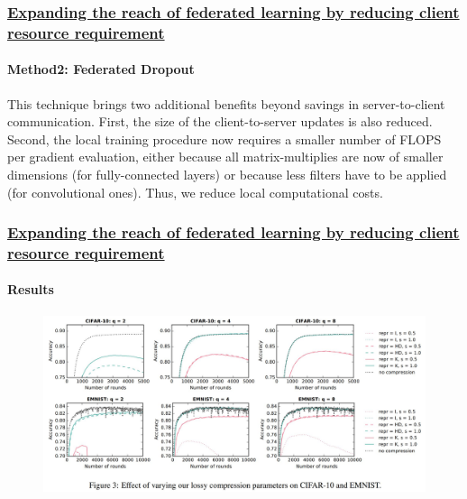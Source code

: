 \documentclass[10pt]{beamer}
\begin{document}
    \begin{frame}
        
        \frametitle{
            \href{https://arxiv.org/pdf/1812.07210.pdf}{
            Expanding the reach of federated learning by reducing client resource requirement
            }
        }

        \framesubtitle{
            Method2: Federated Dropout 
        }

        This technique brings two additional benefits beyond savings in server-to-client communication. First, the size of the
        client-to-server updates is also reduced. Second, the local training procedure now requires a smaller number of FLOPS
        per gradient evaluation, either because all matrix-multiplies are now of smaller dimensions (for fully-connected layers)
        or because less filters have to be applied (for convolutional ones). Thus, we reduce local computational costs.

    \end{frame}


    
    \begin{frame}
        
        \frametitle{
            \href{https://arxiv.org/pdf/1812.07210.pdf}{
            Expanding the reach of federated learning by reducing client resource requirement
            }
        }

        \framesubtitle{
            Results
        }


        \begin{figure}
            \includegraphics[width=\textwidth]{src/img/DpR1.JPG}
        \end{figure}

    \end{frame}
\end{document}
